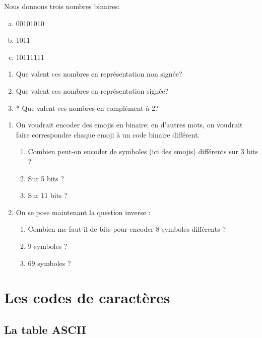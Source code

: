 \documentclass[11pt, a4paper]{book}
\begin{document}
\begin{exercice}
Nous donnons trois nombres binaires:
\begin{enumerate}[a)]
\item 00101010
\item 1011
\item 10111111
\end{enumerate}

\begin{enumerate}
\item Que valent ces nombres en représentation non signée?
\item Que valent ces nombres en représentation signée?
\item * Que valent ces nombres en complément à 2?
\end{enumerate}
\end{exercice}

\begin{exercice}
\begin{enumerate}
\item On voudrait encoder des emojis en binaire; en d'autres mots, on voudrait faire correspondre chaque emoji à un code binaire différent.
\begin{enumerate}
\item Combien peut-on encoder de symboles (ici des emojis) différents sur 3 bits ?
\item Sur 5 bits ?
\item Sur 11 bits ?
\end{enumerate}

\vspace{10pt}
\item On se pose maintenant la question inverse : 
\begin{enumerate}
\item Combien me faut-il de bits pour encoder 8 symboles différents ?
\item 9 symboles ?
\item 69 symboles ?
\end{enumerate}
\end{enumerate}
\end{exercice}



\section{Les codes de caractères}

\subsection{La table ASCII}
\end{document}
